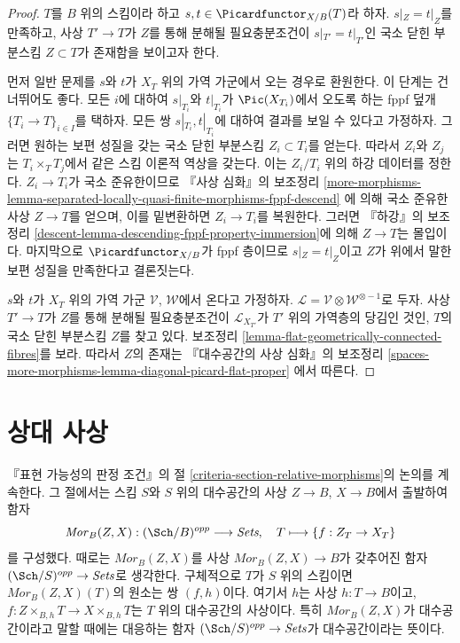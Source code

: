 \begin{proof}
$T$를 $B$ 위의 스킴이라 하고 $s, t \in \Picardfunctor_{X/B}(T)$라 하자.
$s|_Z = t|_Z$를 만족하고, 사상 $T' \to T$가 $Z$를 통해 분해될
필요충분조건이 $s|_{T'} = t|_{T'}$인 국소 닫힌 부분스킴
$Z \subset T$가 존재함을 보이고자 한다.

\medskip\noindent
먼저 일반 문제를 $s$와 $t$가 $X_T$ 위의 가역 가군에서 오는 경우로
환원한다. 이 단계는 건너뛰어도 좋다. 모든 $i$에 대하여
$s|_{T_i}$와 $t|_{T_i}$가 $\Pic(X_{T_i})$에서 오도록 하는 fppf 덮개
$\{T_i \to T\}_{i \in I}$를 택하자. 모든 쌍
$s|_{T_i}, t|_{T_i}$에 대하여 결과를 보일 수 있다고 가정하자.
그러면 원하는 보편 성질을 갖는 국소 닫힌 부분스킴
$Z_i \subset T_i$를 얻는다. 따라서 $Z_i$와 $Z_j$는
$T_i \times_T T_j$에서 같은 스킴 이론적 역상을 갖는다.
이는 $Z_i/T_i$ 위의 하강 데이터를 정한다. $Z_i \to T_i$가
국소 준유한이므로 『사상 심화』의 보조정리
\ref{more-morphisms-lemma-separated-locally-quasi-finite-morphisms-fppf-descend}
에 의해 국소 준유한 사상 $Z \to T$를 얻으며, 이를 밑변환하면
$Z_i \to T_i$를 복원한다. 그러면 『하강』의 보조정리
\ref{descent-lemma-descending-fppf-property-immersion}에 의해
$Z \to T$는 몰입이다. 마지막으로 $\Picardfunctor_{X/B}$가 fppf 층이므로
$s|_Z = t|_Z$이고 $Z$가 위에서 말한 보편 성질을 만족한다고 결론짓는다.

\medskip\noindent
$s$와 $t$가 $X_T$ 위의 가역 가군 $\mathcal{V}$, $\mathcal{W}$에서
온다고 가정하자. %
$\mathcal{L} = \mathcal{V} \otimes \mathcal{W}^{\otimes -1}$로 두자.
사상 $T' \to T$가 $Z$를 통해 분해될 필요충분조건이
$\mathcal{L}_{X_{T'}}$가 $T'$ 위의 가역층의 당김인 것인, $T$의 국소 닫힌
부분스킴 $Z$를 찾고 있다. 보조정리
\ref{lemma-flat-geometrically-connected-fibres}를 보라.
따라서 $Z$의 존재는 『대수공간의 사상 심화』의 보조정리
\ref{spaces-more-morphisms-lemma-diagonal-picard-flat-proper}
에서 따른다.
\end{proof}











\section{상대 사상}
\label{section-relative-morphisms}

\noindent
『표현 가능성의 판정 조건』의 절
\ref{criteria-section-relative-morphisms}의 논의를 계속한다.
그 절에서는 스킴 $S$와 $S$ 위의 대수공간의 사상
$Z \to B$, $X \to B$에서 출발하여 함자
$$
\mathit{Mor}_B(Z, X) : (\Sch/B)^{opp} \longrightarrow \textit{Sets}, \quad
T \longmapsto \{f : Z_T \to X_T\}
$$
를 구성했다. 때로는 $\mathit{Mor}_B(Z, X)$를 사상
$\mathit{Mor}_B(Z, X) \to B$가 갖추어진 함자
$(\Sch/S)^{opp} \to \textit{Sets}$로 생각한다. 구체적으로 $T$가
$S$ 위의 스킴이면 $\mathit{Mor}_B(Z, X)(T)$의 원소는 쌍 $(f, h)$이다.
여기서 $h$는 사상 $h : T \to B$이고,
$f : Z \times_{B, h} T \to X \times_{B, h} T$는
$T$ 위의 대수공간의 사상이다. 특히 $\mathit{Mor}_B(Z, X)$가
대수공간이라고 말할 때에는 대응하는 함자
$(\Sch/S)^{opp} \to \textit{Sets}$가 대수공간이라는 뜻이다.

